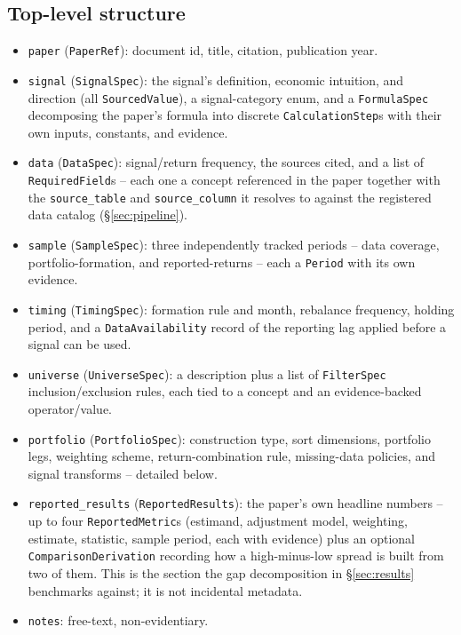 \subsection{Top-level structure}

\begin{itemize}[nosep]
  \item \texttt{paper} (\texttt{PaperRef}): document id, title, citation,
    publication year.
  \item \texttt{signal} (\texttt{SignalSpec}): the signal's definition,
    economic intuition, and direction (all \texttt{SourcedValue}), a
    signal-category enum, and a \texttt{FormulaSpec} decomposing the paper's
    formula into discrete \texttt{CalculationStep}s with their own inputs,
    constants, and evidence.
  \item \texttt{data} (\texttt{DataSpec}): signal/return frequency, the
    sources cited, and a list of \texttt{RequiredField}s -- each one a
    concept referenced in the paper together with the \texttt{source\_table}
    and \texttt{source\_column} it resolves to against the registered data
    catalog (\S\ref{sec:pipeline}).
  \item \texttt{sample} (\texttt{SampleSpec}): three independently tracked
    periods -- data coverage, portfolio-formation, and reported-returns --
    each a \texttt{Period} with its own evidence.
  \item \texttt{timing} (\texttt{TimingSpec}): formation rule and month,
    rebalance frequency, holding period, and a \texttt{DataAvailability}
    record of the reporting lag applied before a signal can be used.
  \item \texttt{universe} (\texttt{UniverseSpec}): a description plus a list
    of \texttt{FilterSpec} inclusion/exclusion rules, each tied to a concept
    and an evidence-backed operator/value.
  \item \texttt{portfolio} (\texttt{PortfolioSpec}): construction type,
    sort dimensions, portfolio legs, weighting scheme, return-combination
    rule, missing-data policies, and signal transforms -- detailed below.
  \item \texttt{reported\_results} (\texttt{ReportedResults}): the paper's
    own headline numbers -- up to four \texttt{ReportedMetric}s (estimand,
    adjustment model, weighting, estimate, statistic, sample period, each
    with evidence) plus an optional \texttt{ComparisonDerivation} recording
    how a high-minus-low spread is built from two of them. This is the
    section the gap decomposition in \S\ref{sec:results} benchmarks against;
    it is not incidental metadata.
  \item \texttt{notes}: free-text, non-evidentiary.
\end{itemize}

